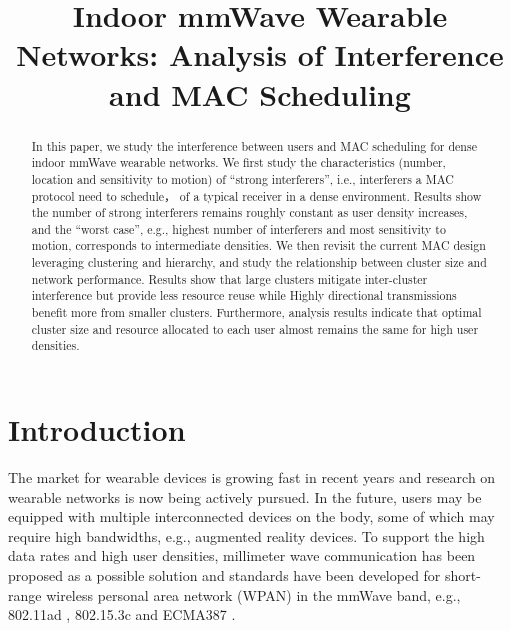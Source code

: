 \documentclass[10pt, conference, letterpaper]{IEEEtran}
\begin{document}
\title{Indoor mmWave Wearable Networks: Analysis of Interference and MAC Scheduling}

\author{
}

\maketitle

\begin{abstract}

In this paper, we study the interference between users and MAC scheduling for dense indoor mmWave wearable networks.
We first study the characteristics (number, location and sensitivity to motion) of ``strong interferers'', i.e., interferers a MAC protocol need to schedule， of a typical receiver in a dense environment.
Results show the number of strong interferers remains roughly constant as user density increases, and the ``worst case'', e.g., highest number of interferers and most sensitivity to motion, corresponds to intermediate densities.
We then revisit the current MAC design leveraging clustering and hierarchy, and study the relationship between cluster size and network performance. 
Results show that large clusters mitigate inter-cluster interference but provide less resource reuse while
Highly directional transmissions benefit more from smaller clusters. 
Furthermore, analysis results indicate that optimal cluster size and resource allocated to each user almost remains the same for high user densities.



\end{abstract}
\IEEEpeerreviewmaketitle

\section{Introduction}\label{section:introduction}
The market for wearable devices is growing fast in recent years \cite{wearable} and research on wearable networks is now being actively pursued. 
In the future, users may be equipped with multiple interconnected devices on the body, some of which may require high bandwidths, e.g., augmented reality devices. 
To support the high data rates and high user densities, millimeter wave communication has been proposed as a possible solution and standards have been developed for short-range wireless personal area network (WPAN) in the mmWave band, e.g., 802.11ad \cite{80211ad}, 802.15.3c \cite{802153c} and ECMA387 \cite{ECMA387}.
\end{document}
